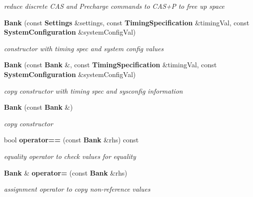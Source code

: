 \begin{CompactItemize}
\begin{CompactList}\small\item\em reduce discrete CAS and Precharge commands to CAS+P to free up space \item\end{CompactList}\item 
{\bf Bank} (const {\bf Settings} \&settings, const {\bf TimingSpecification} \&timingVal, const {\bf SystemConfiguration} \&systemConfigVal)\label{class_d_r_a_msim_i_i_1_1_bank_2fe9b0cf5dd28eb2d756d3f920f26988}

\begin{CompactList}\small\item\em constructor with timing spec and system config values \item\end{CompactList}\item 
{\bf Bank} (const {\bf Bank} \&, const {\bf TimingSpecification} \&timingVal, const {\bf SystemConfiguration} \&systemConfigVal)\label{class_d_r_a_msim_i_i_1_1_bank_a931ab46ebcdb9a382e1dfc54e712414}

\begin{CompactList}\small\item\em copy constructor with timing spec and sysconfig information \item\end{CompactList}\item 
{\bf Bank} (const {\bf Bank} \&)\label{class_d_r_a_msim_i_i_1_1_bank_455d191c606241ace4ff939ae247185e}

\begin{CompactList}\small\item\em copy constructor \item\end{CompactList}\item 
bool {\bf operator==} (const {\bf Bank} \&rhs) const 
\begin{CompactList}\small\item\em equality operator to check values for equality \item\end{CompactList}\item 
{\bf Bank} \& {\bf operator=} (const {\bf Bank} \&rhs)
\begin{CompactList}\small\item\em assignment operator to copy non-reference values \item\end{CompactList}\end{CompactItemize}
